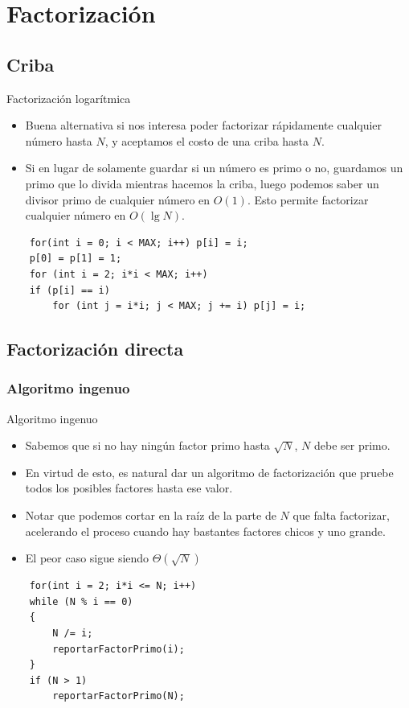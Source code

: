 \documentclass{beamer}
\begin{document}
\section{Factorización}

\subsection{Criba}

\begin{frame}[fragile]{Factorización logarítmica}
  \begin{itemize}
      \item Buena alternativa si nos interesa poder factorizar rápidamente cualquier número hasta $N$, y aceptamos el costo de una criba hasta $N$.
      \item Si en lugar de solamente guardar si un número es primo o no, guardamos un primo que lo divida mientras hacemos la criba, luego podemos saber un divisor primo de cualquier número en $O(1)$. Esto permite factorizar cualquier número en $O(\lg N)$.
  \end{itemize}

\begin{lstlisting}
    for(int i = 0; i < MAX; i++) p[i] = i;
    p[0] = p[1] = 1;
    for (int i = 2; i*i < MAX; i++)
    if (p[i] == i)
        for (int j = i*i; j < MAX; j += i) p[j] = i;
\end{lstlisting}
\end{frame}

\subsection{Factorización directa}

\subsubsection{Algoritmo ingenuo}

\begin{frame}[fragile]{Algoritmo ingenuo}
  \begin{itemize}
      \item Sabemos que si no hay ningún factor primo hasta $\sqrt{N}$, $N$ debe ser primo.
      \item En virtud de esto, es natural dar un algoritmo de factorización que pruebe todos los posibles factores hasta ese valor.
      \item Notar que podemos cortar en la raíz de la parte de $N$ que falta factorizar, acelerando el proceso cuando hay bastantes factores chicos y uno grande.
      \item El peor caso sigue siendo $\Theta(\sqrt{N})$
  \end{itemize}

\begin{lstlisting}
    for(int i = 2; i*i <= N; i++)
    while (N % i == 0)
    {
        N /= i;
        reportarFactorPrimo(i);
    }
    if (N > 1)
        reportarFactorPrimo(N);
\end{lstlisting}
\end{frame}
\end{document}
